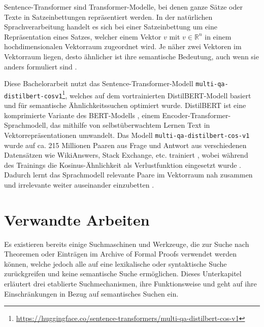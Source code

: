 \documentclass[12pt,letterpaper]{article} %
\begin{document}
Sentence-Transformer sind Transformer-Modelle, bei denen ganze Sätze oder Texte in Satzeinbettungen repräsentiert werden.
In der natürlichen Sprachverarbeitung handelt es sich bei einer Satzeinbettung um eine Repräsentation eines Satzes, welcher einem Vektor $v$ mit $v \in \mathbb{R}^n$ in einem hochdimensionalen Vektorraum zugeordnet wird.
Je näher zwei Vektoren im Vektorraum liegen, desto ähnlicher ist ihre semantische Bedeutung, auch wenn sie anders formuliert sind \citep[S. 2]{colangelo_comparative_2025}.

Diese Bachelorarbeit nutzt das Sentence-Transformer-Modell \texttt{multi-qa-distilbert-cos\-v1}\footnote{\url{https://huggingface.co/sentence-transformers/multi-qa-distilbert-cos-v1}}, welches auf dem vortrainierten DistilBERT-Modell basiert und für semantische Ähn\-lich\-keits\-su\-chen optimiert wurde.
DistilBERT ist eine komprimierte Variante des BERT-Modells \citep{devlin_bert_2019}, einem Encoder-Transformer-Sprachmodell, das mithilfe von selbstüberwachtem Lernen Text in Vektorrepräsentationen umwandelt.
Das Modell \texttt{multi-qa-distilbert-cos-v1} wurde auf ca. 215 Millionen Paaren aus Frage und Antwort aus verschiedenen Datensätzen wie WikiAnswers, Stack Exchange, etc. trainiert \citep[S. 8]{mallick_analyzing_2023}, wobei während des Trainings die Kosinus-Ähnlichkeit als Verlustfunktion eingesetzt wurde \citep[S. 1]{sanh_distilbert_2020}.
Dadurch lernt das Sprachmodell relevante Paare im Vektorraum nah zusammen und irrelevante weiter auseinander einzubetten \citep[S. 1]{reimers_sentence-bert_2019}.
\section{Verwandte Arbeiten}

Es existieren bereits einige Suchmaschinen und Werkzeuge, die zur Suche nach Theoremen oder Einträgen im Archive of Formal Proofs verwendet werden können, welche jedoch alle auf eine lexikalische oder syntaktische Suche zurückgreifen und keine semantische Suche ermöglichen.
Dieses Unterkapitel erläutert drei etablierte Suchmechanismen, ihre Funktionsweise und geht auf ihre Einschränkungen in Bezug auf semantisches Suchen ein.
\end{document}

